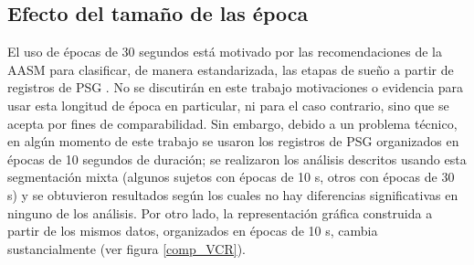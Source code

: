 \documentclass[12pt,a4paper]{mitthesis}
\begin{document}

\subsection{Efecto del tama\~no de las \'epoca}

El uso de \'epocas de 30 segundos est\'a motivado por las recomendaciones de la AASM para 
clasificar, de manera estandarizada, las etapas de sue\~no a partir de registros de PSG 
\cite{AASM07}. 
No se discutir\'an en este trabajo motivaciones o evidencia para usar esta longitud de \'epoca en 
particular, ni para el caso contrario, sino que se acepta por fines de comparabilidad. 
Sin embargo, debido a un problema t\'ecnico, en alg\'un momento de este trabajo se usaron los 
registros de PSG organizados en \'epocas de 10 segundos de duraci\'on; se realizaron los an\'alisis 
descritos usando esta segmentaci\'on mixta (algunos sujetos con \'epocas de 10 s, otros con 
\'epocas de 30 s) y se obtuvieron resultados seg\'un los cuales no hay diferencias significativas 
en ninguno de los an\'alisis. 
Por otro lado, la representaci\'on gr\'afica construida a partir de los mismos datos, organizados
en \'epocas de 10 s, cambia sustancialmente (ver figura \ref{comp_VCR}).
\end{document}
